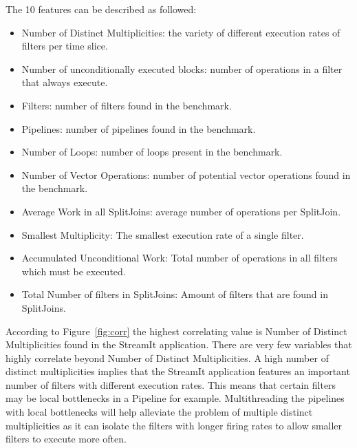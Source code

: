 The 10 features can be described as followed:
\begin{itemize}
\item Number of Distinct Multiplicities: the variety of different execution rates of filters per time slice.
\vspace{-0.5em}
\item Number of unconditionally executed blocks: number of operations in a filter that always execute.
\vspace{-0.5em}
\item Filters: number of filters found in the benchmark.
\vspace{-0.5em}
\item Pipelines: number of pipelines found in the benchmark.
\vspace{-0.5em}
\item Number of Loops: number of loops present in the benchmark.
\vspace{-0.5em}
\item Number of Vector Operations: number of potential vector operations found in the benchmark.
\vspace{-0.5em}
\item Average Work in all SplitJoins: average number of operations per SplitJoin.
\vspace{-0.5em}
\item Smallest Multiplicity: The smallest execution rate of a single filter.
\vspace{-0.5em}
\item Accumulated Unconditional Work: Total number of operations in all filters which must be executed.
\vspace{-0.5em}
\item Total Number of filters in SplitJoins: Amount of filters that are found in SplitJoins.
\end{itemize}

According to Figure~\ref{fig:corr} the highest correlating value is Number of Distinct Multiplicities found in the StreamIt application.
There are very few variables that highly correlate beyond Number of Distinct Multiplicities.
A high number of distinct multiplicities implies that the StreamIt application features an important number of filters with different execution rates.
This means that certain filters may be local bottlenecks in a Pipeline for example.
Multithreading the pipelines with local bottlenecks will help alleviate the problem of multiple distinct multiplicities as it can isolate the filters with longer firing rates to allow smaller filters to execute more often.

